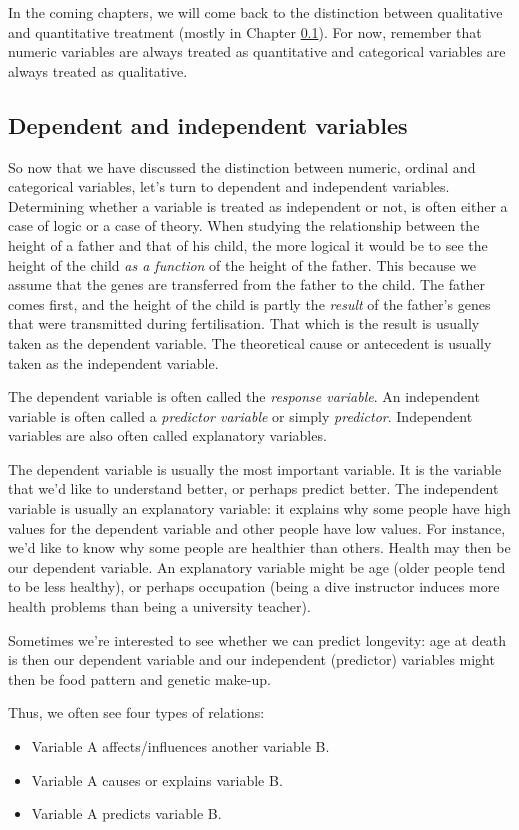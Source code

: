 \documentclass[]{report}\usepackage[]{graphicx}\usepackage[]{color}
\begin{document}
In the coming chapters, we will come back to the distinction between qualitative and quantitative treatment (mostly in Chapter \ref{}). For now, remember that numeric variables are always treated as quantitative and categorical variables are always treated as qualitative.


\subsection{Dependent and independent variables}
So now that we have discussed the distinction between numeric, ordinal and categorical variables, let's turn to dependent and independent variables. Determining whether a variable is treated as independent or not, is often either a case of logic or a case of theory. When studying the relationship between the height of a father and that of his child, the more logical it would be to see the height of the child \textit{as a function} of the height of the father. This because we assume that the genes are transferred from the father to the child. The father comes first, and the height of the child is partly the \textit{result} of the father's genes that were transmitted during fertilisation. That which is the result is usually taken as the dependent variable. The theoretical cause or antecedent is usually taken as the independent variable. 

The dependent variable is often called the \textit{response variable}. An independent variable is often called a \textit{predictor variable} or simply \textit{predictor}. Independent variables are also often called explanatory variables.

The dependent variable is usually the most important variable. It is the variable that we'd like to understand better, or perhaps predict better. The independent variable is usually an explanatory variable: it explains why some people have high values for the dependent variable and other people have low values. For instance, we'd like to know why some people are healthier than others. Health may then be our dependent variable. An explanatory variable might be age (older people tend to be less healthy), or perhaps occupation (being a dive instructor induces more health problems than being a university teacher). 

Sometimes we're interested to see whether we can predict longevity: age at death is then our dependent variable and our independent (predictor) variables might then be food pattern and genetic make-up. 

Thus, we often see four types of relations:
\begin{itemize}
\item Variable A affects/influences another variable B.
\item Variable A causes or explains variable B.
\item Variable A predicts variable B.
\end{itemize}
\end{document}
